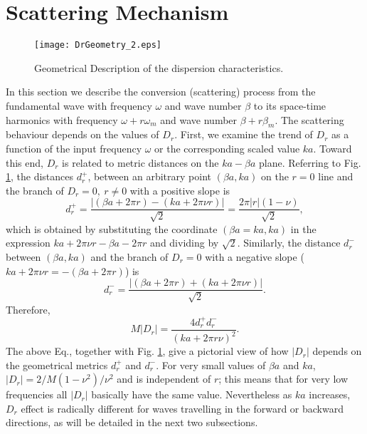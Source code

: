 \documentclass[journal]{IEEEtran}
\begin{document}
\section{Scattering Mechanism}
\begin{figure}
\centering
\texttt{[image: DrGeometry\_2.eps]}
\caption{Geometrical Description of the dispersion characteristics.}
\label{fig:DrGeometry}
\end{figure}
In this section we describe the conversion (scattering) process from the fundamental wave with frequency $\omega$ and wave number $\beta$ to its space-time harmonics with frequency $\omega+r\omega_m$ and wave number $\beta+r\beta_m$. The scattering behaviour depends on the values of $D_r$. First, we examine the trend of $D_r$ as a function of the input frequency $\omega$ or the corresponding scaled value $ka$. Toward this end, $D_r$ is related to metric distances on the $ka-\beta a$ plane. Referring to Fig. \ref{fig:DrGeometry}, the distances $d_{r}^+$, between an arbitrary point $(\beta a, ka)$ on the $r=0$ line and the branch of $D_r=0,~r\neq 0$ with a positive slope is 
\begin{equation}
d_{r}^+=\frac{|(\beta a+2\pi r)-(ka+2\pi\nu r)|}{\sqrt{2}}=\frac{2\pi|r|(1-\nu)}{\sqrt{2}},
\end{equation}
which is obtained by substituting the coordinate $(\beta a=ka, ka )$ in the expression $ka+2\pi\nu r-\beta a-2\pi r$ and dividing by $\sqrt{2}$. Similarly, the distance $d_{r}^-$ between $(\beta a, ka)$ and the branch of $D_r=0$ with a negative slope ($ka+2\pi\nu r=-(\beta a+2\pi r)$) is
\begin{equation}
d_{r}^-=\frac{|(\beta a+2\pi r)+(ka+2\pi\nu r)|}{\sqrt{2}}.
\end{equation}
Therefore,
\begin{equation}
\label{eq:Dr_geometry}
M|D_r|=\frac{4d_{r}^+d_{r}^-}{(ka+2\pi r\nu)^2}.
\end{equation}
The above Eq., together with Fig. \ref{fig:DrGeometry},  give a pictorial view of how $|D_r|$ depends on the geometrical metrics $d_{r}^+$ and $d_{r}^-$. For very small values of $\beta a$ and $ka$, $|D_r|=2/M(1-\nu^2)/\nu^2$ and is independent of $r$; this means that for very low frequencies all $|D_r|$ basically have the same value. Nevertheless as $ka$ increases, $D_r$ effect is radically different for waves travelling in the forward or backward directions, as will be detailed in the next two subsections.
\end{document}
